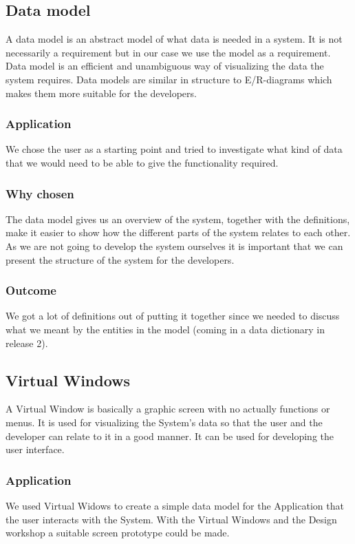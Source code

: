 \documentclass[a4paper]{article}
\begin{document}
		
		
		\subsection{Data model}
A data model is an abstract model of what data is needed in a system. It is not necessarily a requirement but in our case we use the model as a requirement. Data model is an efficient and unambiguous way of visualizing the data the system requires. Data models are similar in structure to E/R-diagrams which makes them more suitable for the developers.
	
		\subsubsection{Application}
		We chose the user as a starting point and tried to investigate what kind of data that we would need to be able to give the functionality required. 
		\subsubsection{Why chosen}
		The data model gives us an overview of the system, together with the definitions, make it easier to show how the different parts of the system relates to each other. As we are not going to develop the system ourselves it is important that we can present the structure of the system for the developers. 
		\subsubsection{Outcome}
	We got a lot of definitions out of putting it together since we needed to discuss what we meant by the entities in the model (coming in a data dictionary in release 2).

		\subsection{Virtual Windows}
			A Virtual Window is basically a graphic screen with no actually functions or menus. It is used for visualizing the System's data so that the user and the developer can relate to it in a good manner. It can be used for developing the user interface.
			\subsubsection{Application}
				We used Virtual Widows to create a simple data model for the Application that the user interacts with the System. With the Virtual Windows and the Design workshop a suitable screen prototype could be made.
\end{document}
